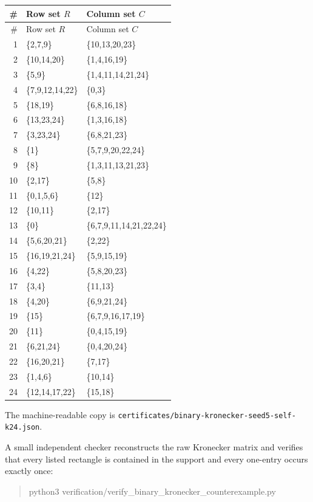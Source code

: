 \documentclass[11pt]{article}
\begin{document}
\renewcommand{\arraystretch}{1.12}
\begin{longtable}{@{}r >{\ttfamily}l >{\ttfamily}l@{}}
\toprule
\# & \normalfont Row set $R$ & \normalfont Column set $C$ \\
\midrule
\endfirsthead
\toprule
\# & \normalfont Row set $R$ & \normalfont Column set $C$ \\
\midrule
\endhead
1  & \{2,7,9\}        & \{10,13,20,23\} \\
2  & \{10,14,20\}     & \{1,4,16,19\} \\
3  & \{5,9\}          & \{1,4,11,14,21,24\} \\
4  & \{7,9,12,14,22\} & \{0,3\} \\
5  & \{18,19\}        & \{6,8,16,18\} \\
6  & \{13,23,24\}     & \{1,3,16,18\} \\
7  & \{3,23,24\}      & \{6,8,21,23\} \\
8  & \{1\}            & \{5,7,9,20,22,24\} \\
9  & \{8\}            & \{1,3,11,13,21,23\} \\
10 & \{2,17\}         & \{5,8\} \\
11 & \{0,1,5,6\}      & \{12\} \\
12 & \{10,11\}        & \{2,17\} \\
13 & \{0\}            & \{6,7,9,11,14,21,22,24\} \\
14 & \{5,6,20,21\}    & \{2,22\} \\
15 & \{16,19,21,24\}  & \{5,9,15,19\} \\
16 & \{4,22\}         & \{5,8,20,23\} \\
17 & \{3,4\}          & \{11,13\} \\
18 & \{4,20\}         & \{6,9,21,24\} \\
19 & \{15\}           & \{6,7,9,16,17,19\} \\
20 & \{11\}           & \{0,4,15,19\} \\
21 & \{6,21,24\}      & \{0,4,20,24\} \\
22 & \{16,20,21\}     & \{7,17\} \\
23 & \{1,4,6\}        & \{10,14\} \\
24 & \{12,14,17,22\}  & \{15,18\} \\
\bottomrule
\end{longtable}

The machine-readable copy is \texttt{certificates/binary-kronecker-seed5-self-k24.json}.

A small independent checker reconstructs the raw Kronecker matrix and verifies that every listed rectangle is contained in the support and every one-entry occurs exactly once:
\begin{quote}\ttfamily
python3 verification/verify\_binary\_kronecker\_counterexample.py
\end{quote}
\end{document}
